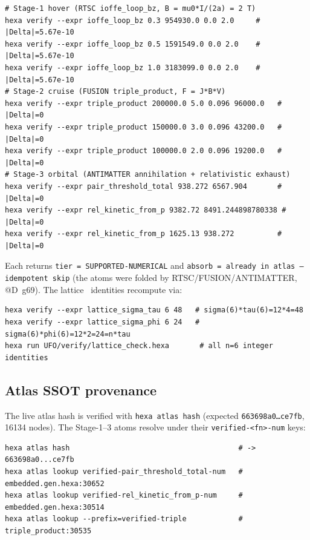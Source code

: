\begin{lstlisting}
# Stage-1 hover (RTSC ioffe_loop_bz, B = mu0*I/(2a) = 2 T)
hexa verify --expr ioffe_loop_bz 0.3 954930.0 0.0 2.0     # |Delta|=5.67e-10
hexa verify --expr ioffe_loop_bz 0.5 1591549.0 0.0 2.0    # |Delta|=5.67e-10
hexa verify --expr ioffe_loop_bz 1.0 3183099.0 0.0 2.0    # |Delta|=5.67e-10
# Stage-2 cruise (FUSION triple_product, F = J*B*V)
hexa verify --expr triple_product 200000.0 5.0 0.096 96000.0   # |Delta|=0
hexa verify --expr triple_product 150000.0 3.0 0.096 43200.0   # |Delta|=0
hexa verify --expr triple_product 100000.0 2.0 0.096 19200.0   # |Delta|=0
# Stage-3 orbital (ANTIMATTER annihilation + relativistic exhaust)
hexa verify --expr pair_threshold_total 938.272 6567.904       # |Delta|=0
hexa verify --expr rel_kinetic_from_p 9382.72 8491.244898780338 # |Delta|=0
hexa verify --expr rel_kinetic_from_p 1625.13 938.272          # |Delta|=0
\end{lstlisting}

Each returns \texttt{tier = SUPPORTED-NUMERICAL} and
\texttt{absorb = already in atlas -- idempotent skip} (the atoms were
folded by RTSC/FUSION/ANTIMATTER, @D~g69). The lattice \tierBlue\
identities recompute via:

\begin{lstlisting}
hexa verify --expr lattice_sigma_tau 6 48   # sigma(6)*tau(6)=12*4=48
hexa verify --expr lattice_sigma_phi 6 24   # sigma(6)*phi(6)=12*2=24=n*tau
hexa run UFO/verify/lattice_check.hexa       # all n=6 integer identities
\end{lstlisting}

\subsection{Atlas SSOT provenance}
\label{app:repro-atlas}

The live atlas hash is verified with \verb|hexa atlas hash| (expected
\texttt{663698a0\dots ce7fb}, 16134 nodes). The Stage-1--3 atoms resolve
under their \texttt{verified-<fn>-num} keys:

\begin{lstlisting}
hexa atlas hash                                       # -> 663698a0...ce7fb
hexa atlas lookup verified-pair_threshold_total-num   # embedded.gen.hexa:30652
hexa atlas lookup verified-rel_kinetic_from_p-num     # embedded.gen.hexa:30514
hexa atlas lookup --prefix=verified-triple            # triple_product:30535
\end{lstlisting}

